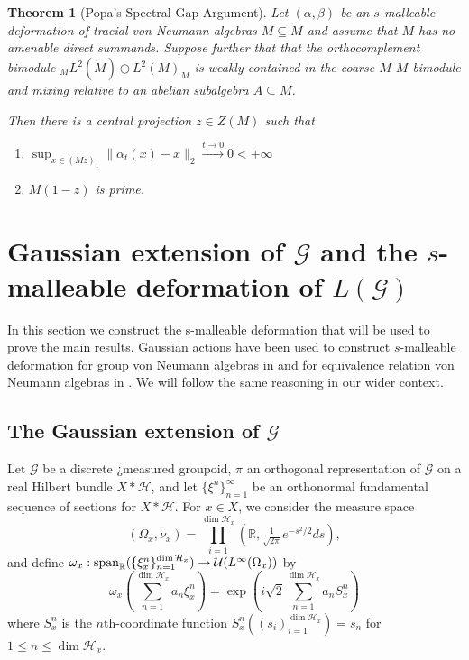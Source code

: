 \documentclass[a4paper,11pt]{article}
\numberwithin{equation}{section}
\newtheorem{thm}{Theorem}[section]
\theoremstyle{definition}
\theoremstyle{remark}
\numberwithin{equation}{section}
\newcommand{\rG}{\mathcal{G}}
\def\H{\mathcal H}
\def\R{\mathbb{R}}
\newcommand{\spn}{{\rm span}}
\newcommand{\U}{\mathcal{U}}
\def\sub{\subseteq}
\providecommand{\norm}[1]{\lVert#1\rVert}
\numberwithin{equation}{section}
\begin{document}
\begin{thm}[Popa's Spectral Gap Argument]\label{popaspectralgap}
    Let $ (\alpha,\beta) $ be an $ s $-malleable deformation of tracial von Neumann algebras $ M\sub \widetilde{M} $ and assume that $M$ has no amenable direct summands. Suppose further that that the orthocomplement bimodule $_{M} L^2(\widetilde{M}) \ominus L^2(M)_M $ is weakly contained in the coarse $M$-$M$ bimodule and mixing relative to an abelian subalgebra $A\sub M$.

    Then there is a central projection $z\in Z(M)$ such that 
    \begin{enumerate}
        \item $ \sup_{x\in (Mz)_{1}} \norm{\alpha_{t}(x)-x}_{2} \xrightarrow{t\to0}0 < +\infty $
        \item $M(1-z)$ is prime.
    \end{enumerate}
    
    
\end{thm}









\section{Gaussian extension of $\rG$ and the $s$-malleable deformation of $L(\rG)$} 

In this section we construct the s-malleable deformation that will be used to prove the main results. Gaussian actions have been used to construct $s$-malleable deformation for group von Neumann algebras in \cite{dSHH:21, ps:12, sinclair:11} and for equivalence relation von Neumann algebras in \cite{hoff:16}. We will follow the same reasoning in our wider context. 

\subsection{The Gaussian extension of $\rG$} 
Let $ \rG $ be a discrete ¿measured groupoid, $\pi$ an orthogonal representation of $\rG$ on a real Hilbert bundle $X \ast \H$, and let $\{\xi^n\}_{n = 1}^\infty$ be an orthonormal fundamental sequence of sections for $X \ast \H$. For $x\in X$, we consider the measure space
\begin{equation}
    (\Omega_x, \nu_x) = \prod_{i = 1}^{\dim \H_x} (\R, \tfrac{1}{\sqrt{2\pi}}e^{-s^2/2}ds),
\end{equation}
and define $\omega_x: \spn_\R (\{\xi_x^n\}_{n = 1}^{\dim \H_x}) \to \U(L^\infty(\Omega_x))$ by
\begin{equation}
    \omega_x\left(\sum_{n = 1}^{\dim \H_x} a_n\xi_x^{n}\right) = \exp\left({i\sqrt{2}\sum_{n = 1}^{\dim \H_x} a_nS_x^{n}}\right)
\end{equation} where $S^n_x$ is the $n$th-coordinate function $S_x^n((s_i)_{i = 1}^{\dim \H_x}) = s_n$ for $1\le n \le \dim \H_x$.
\end{document}
